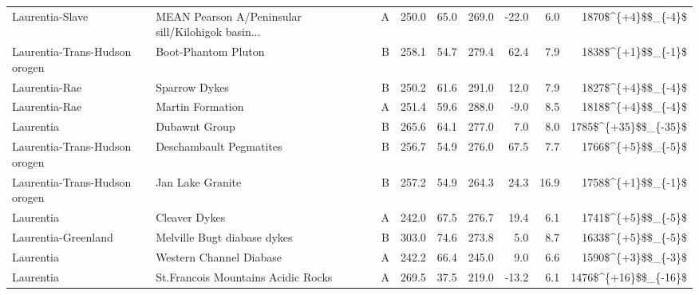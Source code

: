 \begin{longtable}{p{1 in}p{1 in}rrrrrrr}
               Laurentia-Slave &  MEAN Pearson A/Peninsular sill/Kilohigok basin... &      A &     250.0 &      65.0 & 269.0 & -22.0 &       6.0 &     1870\$\textasciicircum \{+4\}\$\$\_\{-4\}\$ \\
 Laurentia-Trans-Hudson orogen &                                Boot-Phantom Pluton &      B &     258.1 &      54.7 & 279.4 &  62.4 &       7.9 &     1838\$\textasciicircum \{+1\}\$\$\_\{-1\}\$ \\
                 Laurentia-Rae &                                      Sparrow Dykes &      B &     250.2 &      61.6 & 291.0 &  12.0 &       7.9 &     1827\$\textasciicircum \{+4\}\$\$\_\{-4\}\$ \\
                 Laurentia-Rae &                                   Martin Formation &      A &     251.4 &      59.6 & 288.0 &  -9.0 &       8.5 &     1818\$\textasciicircum \{+4\}\$\$\_\{-4\}\$ \\
                     Laurentia &                                      Dubawnt Group &      B &     265.6 &      64.1 & 277.0 &   7.0 &       8.0 &   1785\$\textasciicircum \{+35\}\$\$\_\{-35\}\$ \\
 Laurentia-Trans-Hudson orogen &                            Deschambault Pegmatites &      B &     256.7 &      54.9 & 276.0 &  67.5 &       7.7 &     1766\$\textasciicircum \{+5\}\$\$\_\{-5\}\$ \\
 Laurentia-Trans-Hudson orogen &                                   Jan Lake Granite &      B &     257.2 &      54.9 & 264.3 &  24.3 &      16.9 &     1758\$\textasciicircum \{+1\}\$\$\_\{-1\}\$ \\
                     Laurentia &                                      Cleaver Dykes &      A &     242.0 &      67.5 & 276.7 &  19.4 &       6.1 &     1741\$\textasciicircum \{+5\}\$\$\_\{-5\}\$ \\
           Laurentia-Greenland &                        Melville Bugt diabase dykes &      B &     303.0 &      74.6 & 273.8 &   5.0 &       8.7 &     1633\$\textasciicircum \{+5\}\$\$\_\{-5\}\$ \\
                     Laurentia &                            Western Channel Diabase &      A &     242.2 &      66.4 & 245.0 &   9.0 &       6.6 &     1590\$\textasciicircum \{+3\}\$\$\_\{-3\}\$ \\
                     Laurentia &                 St.Francois Mountains Acidic Rocks &      A &     269.5 &      37.5 & 219.0 & -13.2 &       6.1 &   1476\$\textasciicircum \{+16\}\$\$\_\{-16\}\$ \\

\end{longtable}
